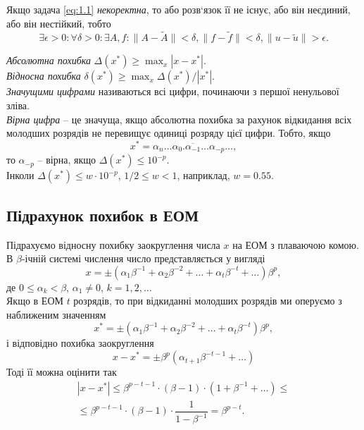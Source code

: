 Якщо задача \eqref{eq:1.1} \textit{некоректна}, то або розв‘язок її не існує, або він неєдиний, або він нестійкий, тобто 
\begin{equation}
	\label{eq:1.6}
	\exists \epsilon > 0: \forall \delta > 0: \exists A, f: \| A - \tilde A\|<\delta, \|f-\tilde f\| < \delta, \|u-\tilde u\| > \epsilon.
\end{equation}

\textit{Абсолютна похибка} $\Delta (x^*) \ge \max_x |x - x^*|$. \\

\textit{Відносна похибка} $\delta (x^*) \ge \max_x \Delta (x^*) / |x^*|$. \\

\textit{Значущими цифрами} називаються всі цифри, починаючи з першої ненульової зліва. \\

\textit{Вірна цифра} -- це значуща, якщо абсолютна похибка за рахунок відкидання всіх молодших розрядів не перевищує одиниці розряду цієї цифри. Тобто, якщо 
\begin{equation}
	\label{eq:1.7}
	x^* = \overline{\alpha_n \ldots \alpha_0.\alpha_{-1}\ldots\alpha_{-p}\ldots},
\end{equation}
то $\alpha_{-p}$ -- вірна, якщо $\Delta (x^*) \le 10^{-p}$. \\

Інколи $\Delta (x^*) \le w \cdot 10^{-p}$, $1/2 \le w < 1$, наприклад, $w = 0.55$.

\subsection{Підрахунок похибок в ЕОМ}

Підрахуємо відносну похибку заокруглення числа $x$ на ЕОМ з плаваючою комою. В $\beta$-ічній системі числення число представляється у вигляді
\begin{equation}
	\label{eq:1.8}
	x = \pm (\alpha_1 \beta^{-1} + \alpha_2 \beta^{-2} + \ldots + \alpha_t \beta^{-t} + \ldots) \beta^p,
\end{equation}
де $0 \le \alpha_k < \beta$, $\alpha_1 \ne 0$, $k = 1,2,\ldots$ \\

Якщо в ЕОМ $t$ розрядів, то при відкиданні молодших розрядів ми оперуємо з наближеним значенням 
\begin{equation}
	\label{eq:1.9}
	x^* = \pm (\alpha_1 \beta^{-1} + \alpha_2 \beta^{-2} + \ldots + \alpha_t \beta^{-t}) \beta^p,
\end{equation}
і відповідно похибка заокруглення 
\begin{equation}
	\label{eq:1.9_1}
	x - x^* = \pm \beta^p (\alpha_{t+1} \beta^{-t-1} + \ldots)
\end{equation}
Тоді її можна оцінити так
\begin{multline}
	\label{eq:1.10}
	|x - x^*| \le \beta^{p-t-1} \cdot (\beta-1) \cdot (1 + \beta^{-1}+\ldots)\le\\
	\le \beta^{p-t-1} \cdot (\beta-1) \cdot \dfrac{1}{1-\beta^{-1}}=\beta^{p-t}.
\end{multline}

